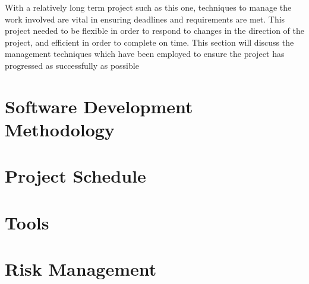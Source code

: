 % 

With a relatively long term project such as this one, techniques to manage the work involved are vital in ensuring deadlines and requirements are met.
This project needed to be flexible in order to respond to changes in the direction of the project, and efficient in order to complete on time.
This section will discuss the management techniques which have been employed to ensure the project has progressed as successfully as possible

\section{Software Development Methodology}
\label{software_development_methodology}


\section{Project Schedule}
\label{project_schedule}


\section{Tools}
\label{tools}


\section{Risk Management}
\label{risk_management}

